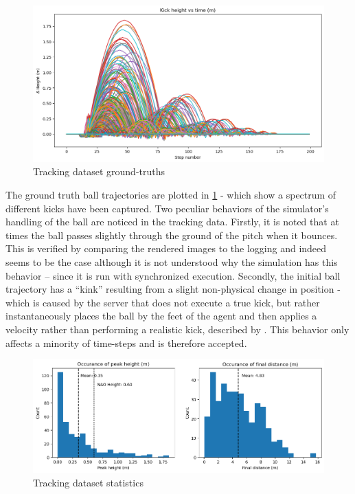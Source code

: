 \documentclass[a4paper,twoside,12pt]{report}
\begin{document}
\begin{figure}[h!]
\begin{center}
\includegraphics[width=14cm]{images/plotkicks.png}
\caption{Tracking dataset ground-truths}
\label{fig:plotkicks}
\end{center}
\end{figure}

The ground truth ball trajectories are plotted in \ref{fig:plotkicks} - which show a spectrum of different kicks have been captured. Two peculiar behaviors of the simulator's handling of the ball are noticed in the tracking data. Firstly, it is noted that at times the ball passes slightly through the ground of the pitch when it bounces. This is verified by comparing the rendered images to the logging and indeed seems to be the case although it is not understood why the simulation has this behavior -- since it is run with synchronized execution. Secondly, the initial ball trajectory has a ``kink'' resulting from a slight non-physical change in position - which is caused by the server that does not execute a true kick, but rather instantaneously places the ball by the feet of the agent and then applies a velocity rather than performing a realistic kick, described by \cite{fatproxy}. This behavior only affects a minority of time-steps and is therefore accepted.

\begin{figure}[h!]
\begin{center}
\includegraphics[width=16cm]{images/trackingplot.png}
\caption{Tracking dataset statistics}
\label{fig:trackplot}
\end{center}
\end{figure}
\end{document}

